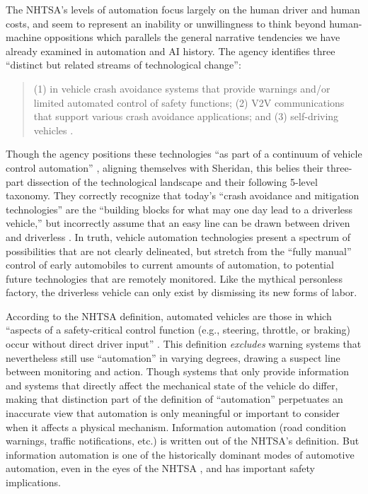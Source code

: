 The NHTSA's levels of automation focus largely on the human driver and
human costs, and seem to represent an inability or unwillingness to
think beyond human-machine oppositions which 
parallels the general narrative tendencies we have already examined in
automation and AI history. 
The agency identifies three ``distinct but related streams of
technological change'': 
\begin{quote}
(1) in vehicle crash avoidance systems that provide warnings and/or
limited automated control of safety functions; (2) V2V communications
that support various crash avoidance applications; and (3)
self-driving vehicles \cite[p. 3]{NHTSA}.\end{quote}
Though the agency positions these technologies ``as part of a
continuum of vehicle control automation'' \cite[p. 3]{NHTSA}, aligning
themselves with Sheridan, this belies
their three-part dissection of the technological landscape and their
following 5-level taxonomy. They correctly recognize that today's
``crash avoidance and mitigation technologies'' are the ``building blocks
for what may one day lead to a driverless vehicle,'' but incorrectly
assume that an easy line can be drawn between driven and
driverless \cite[p. 3]{NHTSA}. In truth, vehicle automation
technologies present a spectrum of possibilities that are not clearly
delineated, but stretch from the ``fully manual'' control of early
automobiles to current amounts of automation, to potential future
technologies that are remotely monitored. Like the mythical personless
factory, the driverless vehicle can only exist by dismissing its new forms
of labor. 


According to the NHTSA definition, automated
vehicles are those in which ``aspects of a safety-critical control
function (e.g., steering, throttle, or braking) occur without direct
driver input'' \cite[p. 3]{NHTSA}. This definition \emph{excludes} warning
systems that nevertheless still use ``automation'' in varying degrees,
drawing a suspect line between monitoring and action. Though systems
that only provide information and systems 
that directly affect the mechanical state of the vehicle do differ, making that
distinction part of the definition of ``automation'' perpetuates an
inaccurate view that automation is only meaningful or important to
consider when it affects a physical mechanism. Information automation
(road condition warnings, traffic notifications, etc.)
is written out of the NHTSA's definition. But information automation
is one of the historically dominant modes of automotive automation,
even in the eyes of the NHTSA \cite[p. 11]{wetmore}, and has important
safety implications.

